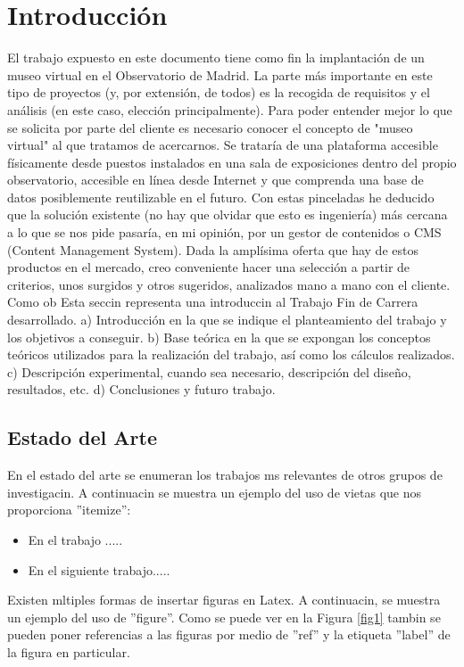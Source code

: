 \section{Introducci\'on}
El trabajo expuesto en este documento tiene como fin la implantación de un museo virtual en el Observatorio de Madrid. La parte más importante en este tipo de proyectos (y, por extensión, de todos) es la recogida de requisitos y el análisis (en este caso, elección principalmente).
Para poder entender mejor lo que se solicita por parte del cliente es necesario conocer el concepto de "museo virtual" al que tratamos de acercarnos. Se trataría de una plataforma accesible físicamente desde puestos instalados en una sala de exposiciones dentro del propio observatorio, accesible en línea desde Internet y que comprenda una base de datos posiblemente reutilizable en el futuro. Con estas pinceladas he deducido que la solución existente (no hay que olvidar que esto es ingeniería) más cercana a lo que se nos pide pasaría, en mi opinión, por un gestor de contenidos o CMS (Content Management System).
Dada la amplísima oferta que hay de estos productos en el mercado, creo conveniente hacer una selección a partir de criterios, unos surgidos y otros sugeridos, analizados mano a mano con el cliente.
Como ob
Esta seccin representa una introduccin al Trabajo Fin de Carrera desarrollado.
a) Introducción en la que se indique el planteamiento del trabajo y los
objetivos a conseguir.
b) Base teórica en la que se expongan los conceptos teóricos utilizados para
la realización del trabajo, así como los cálculos realizados.
c) Descripción experimental, cuando sea necesario, descripción del diseño,
resultados, etc.
d) Conclusiones y futuro trabajo.


\subsection{Estado del Arte}
En el estado del arte se enumeran los trabajos ms relevantes de otros grupos de investigacin. A continuacin se muestra un ejemplo del uso de vietas que nos proporciona ''itemize'':

\begin{itemize}
\item En el trabajo ..... 
\item En el siguiente trabajo.....
\end{itemize}

Existen mltiples formas de insertar figuras en Latex. A continuacin, se muestra un ejemplo del uso de ''figure''. Como se puede ver en la Figura \ref{fig1} tambin se pueden poner referencias a las figuras por medio de ''ref'' y la etiqueta ''label'' de la figura en particular.

